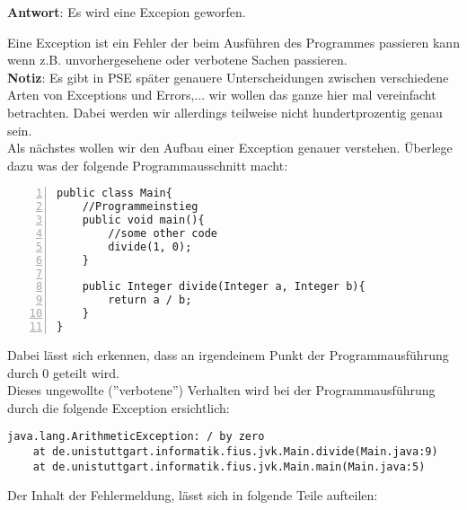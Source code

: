 \textbf{Antwort}: Es wird  eine Excepion geworfen.\\
\begin{Infobox}[Exception]
    Eine Exception ist ein Fehler der beim Ausführen des Programmes passieren kann wenn z.B. unvorhergesehene oder verbotene Sachen passieren.\\


    \textbf{Notiz}: Es gibt in PSE später genauere Unterscheidungen zwischen verschiedene Arten von Exceptions und Errors,... wir wollen das ganze hier mal vereinfacht betrachten. Dabei werden wir allerdings teilweise nicht hundertprozentig genau sein.\\

    Als nächstes wollen wir den Aufbau einer Exception genauer verstehen.
    Überlege dazu was der folgende Programmausschnitt macht:

    \begin{lstlisting}[numbers=left,xleftmargin=2em,frame=single,framexleftmargin=1.5em]
public class Main{
    //Programmeinstieg
    public void main(){
        //some other code
        divide(1, 0);
    }
    
    public Integer divide(Integer a, Integer b){
        return a / b;
    }
}
    \end{lstlisting}

    Dabei lässt sich erkennen, dass an irgendeinem Punkt der Programmausführung durch 0 geteilt wird.\\
    Dieses ungewollte (''verbotene'') Verhalten wird bei der Programmausführung durch die folgende Exception ersichtlich:

    \begin{lstlisting}[keywords={}, breaklines=true, numbers=none]
java.lang.ArithmeticException: / by zero
    at de.unistuttgart.informatik.fius.jvk.Main.divide(Main.java:9)
    at de.unistuttgart.informatik.fius.jvk.Main.main(Main.java:5)
    \end{lstlisting}    

    Der Inhalt der Fehlermeldung, lässt sich in folgende Teile aufteilen:


\end{Infobox}
